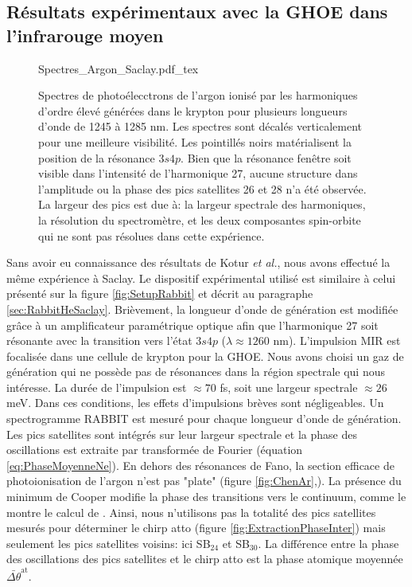 \subsection{Résultats expérimentaux avec la GHOE dans l'infrarouge moyen}
\begin{figure}[ht]
\centering
\def\svgwidth{1\textwidth}
{Spectres_Argon_Saclay.pdf_tex}
\caption{Spectres de photoélecctrons de l'argon ionisé par les harmoniques d'ordre élevé générées dans le krypton pour plusieurs longueurs d'onde de 1245 à 1285 nm. Les spectres sont décalés verticalement pour une meilleure visibilité. Les pointillés noirs matérialisent la position de la résonance $3s4p$. Bien que la résonance fenêtre soit visible dans l'intensité de l'harmonique 27, aucune structure dans l'amplitude ou la phase des pics satellites 26 et 28 n'a été observée. La largeur des pics est due à: la largeur spectrale des harmoniques, la résolution du spectromètre, et les deux composantes spin-orbite qui ne sont pas résolues dans cette expérience.}
\label{fig:Spectres_Argon_Saclay}
\end{figure}

Sans avoir eu connaissance des résultats de Kotur \textit{et al.}, nous avons effectué la même expérience à Saclay. Le dispositif expérimental utilisé est similaire à celui présenté sur la figure \ref{fig:SetupRabbit} et décrit au paragraphe \ref{sec:RabbitHeSaclay}. Brièvement, la longueur d'onde de génération est modifiée grâce à un amplificateur paramétrique optique afin que l'harmonique 27 soit résonante avec la transition vers l'état $3s4p$ ($\lambda \approx 1260$ nm). L'impulsion MIR est focalisée dans une cellule de krypton pour la GHOE. Nous avons choisi un gaz de génération qui ne possède pas de résonances dans la région spectrale qui nous intéresse.  La durée de l'impulsion est $\approx 70$ fs, soit une largeur spectrale $\approx 26$ meV. Dans ces conditions, les effets d'impulsions brèves sont négligeables. Un spectrogramme RABBIT est mesuré pour chaque longueur d'onde de génération. Les pics satellites sont intégrés sur leur largeur spectrale et la phase des oscillations est extraite par transformée de Fourier (équation \ref{eq:PhaseMoyenneNe}). En dehors des résonances de Fano, la section efficace de photoionisation de l'argon n'est pas "plate" (figure \ref{fig:ChenAr},). La présence du minimum de Cooper  modifie la phase des transitions vers le continuum, comme le montre le calcul de . Ainsi, nous n'utilisons pas la totalité des pics satellites mesurés pour déterminer le chirp atto (figure \ref{fig:ExtractionPhaseInter}) mais seulement les pics satellites voisins: ici SB$_{24}$ et SB$_{30}$. La différence entre la phase des oscillations des pics satellites et le chirp atto est la phase atomique moyennée $\bar{\Delta \theta}^{\text{at}}$.

